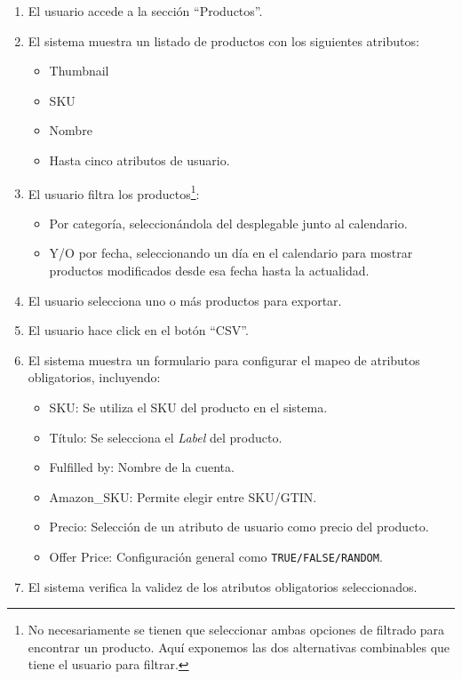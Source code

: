 \begin{enumerate}
    \item El usuario accede a la sección \enquote{Productos}.
    \item El sistema muestra un listado de productos con los siguientes atributos:
    \begin{itemize}
        \item Thumbnail
        \item SKU
        \item Nombre
        \item Hasta cinco atributos de usuario.
    \end{itemize}
    \item El usuario filtra los productos\footnote{No necesariamente se tienen que seleccionar ambas opciones de filtrado para encontrar un producto. Aquí exponemos las dos alternativas combinables que tiene el usuario para filtrar.}:
    \begin{itemize}
        \item Por categoría, seleccionándola del desplegable junto al calendario.
        \item Y/O por fecha, seleccionando un día en el calendario para mostrar productos modificados desde esa fecha hasta la actualidad.
    \end{itemize}
    \item El usuario selecciona uno o más productos para exportar.
    \item El usuario hace click en el botón \enquote{CSV}.
    \item El sistema muestra un formulario para configurar el mapeo de atributos obligatorios, incluyendo:
    \begin{itemize}
        \item SKU: Se utiliza el SKU del producto en el sistema.
        \item Título: Se selecciona el \textit{Label} del producto.
        \item Fulfilled by: Nombre de la cuenta.
        \item Amazon\_SKU: Permite elegir entre SKU/GTIN.
        \item Precio: Selección de un atributo de usuario como precio del producto.
        \item Offer Price: Configuración general como \texttt{TRUE/FALSE/RANDOM}.
    \end{itemize}
    \item El sistema verifica la validez de los atributos obligatorios seleccionados.

\end{enumerate}
